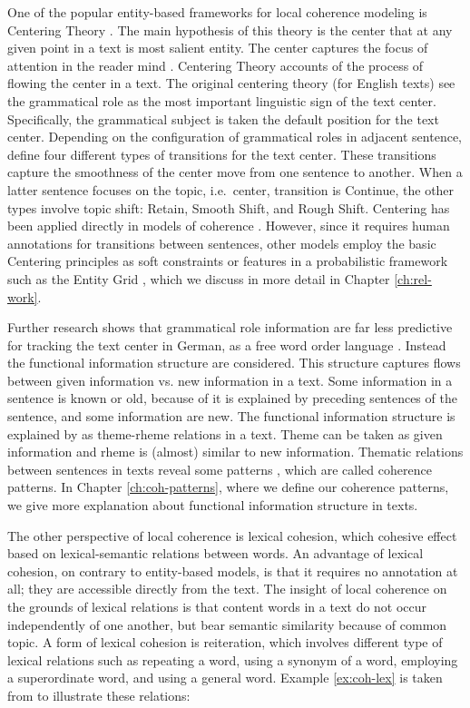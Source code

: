 One of the popular entity-based frameworks for local coherence modeling is Centering Theory \cite{grosz95}. 
The main hypothesis of this theory is the center that at any given point in a text is most salient entity.  
The center captures the focus of attention in the reader mind \cite{grosz95}.
Centering Theory accounts of the process of flowing the center in a text. 
The original centering theory (for English texts) see the grammatical role as the most important linguistic sign of the text center. 
Specifically, the grammatical subject is taken the default position for the text center. 
Depending on the configuration of grammatical roles in adjacent sentence,  define four different types of transitions for the text center. 
These transitions capture the smoothness of the center move from one sentence to another. 
When a latter sentence focuses on the topic, i.e.\ center, transition is Continue, the other types involve topic shift: Retain, Smooth Shift, and Rough Shift. 
Centering has been applied directly in models of coherence \cite{karamanis04}.  
However, since it requires human annotations for transitions between sentences, other models employ the basic Centering principles as soft constraints or features in a probabilistic framework such as the Entity Grid , which we discuss in more detail in Chapter \ref{ch:rel-work}.

Further research shows that grammatical role information are far less predictive for tracking the text center in German, as a free word order language \cite{strube.acl96}. 
Instead the functional information structure \cite{danes74} are considered. 
This structure captures flows between given information vs. new information in a text. 
Some information in a sentence is known or old, because of it is explained by preceding sentences of the sentence, and some information are new.  
The functional information structure is explained by  as theme-rheme relations in a text. 
Theme can be taken as given information and rheme is (almost) similar to new information. 
Thematic relations between sentences in texts reveal some patterns \cite{danes74}, which are called  coherence patterns.  
In Chapter \ref{ch:coh-patterns}, where we define our coherence patterns, we give more explanation about functional information structure \cite{danes74} in texts.  


The other perspective of local coherence is lexical cohesion, which cohesive effect based on lexical-semantic relations between words. 
An advantage of lexical cohesion, on contrary to entity-based models, is that it requires no annotation at all; they are accessible directly from the text. 
The insight of local coherence on the grounds of lexical relations is that content words in a text do not occur independently of one another, but bear semantic similarity because of common topic. 
A form of lexical cohesion is reiteration, which involves different type of lexical relations such as repeating a word, using a synonym of a word, employing a superordinate word, and using a general word. 
Example \ref{ex:coh-lex} is taken from \cite{halliday78} to illustrate these relations:

